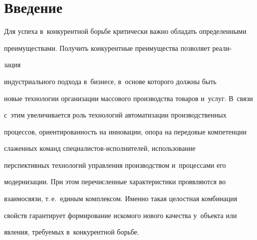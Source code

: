  \thispagestyle{headings}


 


 \vspace*{-12pt}





\section{Введение}





\vspace*{-4pt}


  


  Для успеха в~конкурентной борьбе критически важно обладать определенными 


преимуществами. Получить конкурентные преимущества позволяет реали-\linebreak\vspace*{-12pt}





\pagebreak





\noindent


зация 


индустриального подхода в~бизнесе, в~основе которого должны быть 


новые технологии организации массового производства товаров и~услуг. В~связи 


с~этим увеличивается роль технологий автоматизации производственных 


процессов, ори\-ен\-ти\-ро\-ван\-ность на инновации, опора на передовые компетенции 


слаженных команд спе\-ци\-а\-листов-ис\-пол\-ни\-те\-лей, использование 


перспективных технологий управ\-ле\-ния производством и~процессами его 


модернизации. При этом пе\-ре\-чис\-лен\-ные характеристики проявляются во 


взаимосвязи, т.\,е.\ единым комплексом. Именно такая целостная комбинация 


свойств гарантирует формирование искомого нового качества у~объекта или 


явления, тре\-бу\-емых в~конкурентной \mbox{борьбе}.


